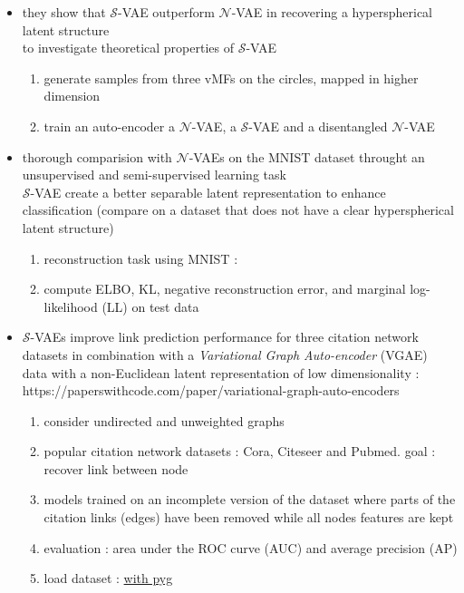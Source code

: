\documentclass[12pt]{article}
\newcommand{\n}{\mathcal{N}} %
\newcommand{\Ss}{\mathcal{S}} %
\begin{document}
\begin{itemize}
    \item they show that $\mathcal{S}$-VAE outperform $\mathcal{N}$-VAE in recovering a hyperspherical latent structure \\ 
        to investigate theoretical properties of $\mathcal{S}$-VAE \\ 
        \begin{enumerate}
            \item generate samples from three vMFs on the circles, mapped in higher dimension 
            \item train an auto-encoder a $\n$-VAE, a $\Ss$-VAE and a disentangled $\n$-VAE
        \end{enumerate}
    \item thorough comparision with $\mathcal{N}$-VAEs on the MNIST dataset throught an unsupervised and semi-supervised learning task \\
            $\mathcal{S}$-VAE create a better separable latent representation to enhance classification
            (compare on a dataset that does not have a clear hyperspherical latent structure)
            \begin{enumerate}
                \item reconstruction task using MNIST : 
                \item compute ELBO, KL, negative reconstruction error, and marginal log-likelihood (LL) on test data
            \end{enumerate}
                
    \item $\mathcal{S}$-VAEs improve link prediction performance for three citation network datasets in combination with a \textit{Variational Graph Auto-encoder} (VGAE) \\
            data with a non-Euclidean latent representation of low dimensionality : https://paperswithcode.com/paper/variational-graph-auto-encoders 
            \begin{enumerate}
                \item consider undirected and unweighted graphs
                \item popular citation network datasets : Cora, Citeseer and Pubmed. goal : recover link between node
                \item models trained on an incomplete version of the dataset where parts of the citation links (edges) have been removed while all nodes features are kept
                \item evaluation : area under the ROC curve (AUC) and average precision (AP)
                \item load dataset : \href{https://pytorch-geometric.readthedocs.io/en/latest/generated/torch_geometric.datasets.Planetoid.html#torch_geometric.datasets.Planetoid}{with pyg}
            \end{enumerate}
\end{itemize}
\end{document}
